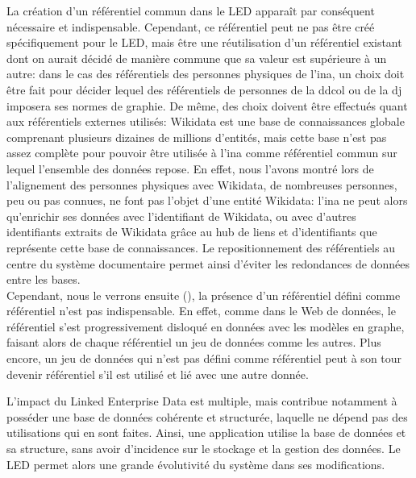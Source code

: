 La création d'un référentiel commun dans le LED apparaît par conséquent nécessaire et indispensable. Cependant, ce référentiel peut ne pas être créé spécifiquement pour le LED, mais être une réutilisation d'un référentiel existant dont on aurait décidé de manière commune que sa valeur est supérieure à un autre: dans le cas des référentiels des personnes physiques de l'\ac{ina}, un choix doit être fait pour décider lequel des référentiels de personnes de la \ac{ddcol} ou de la \ac{dj} imposera ses normes de graphie. De même, des choix doivent être effectués quant aux référentiels externes utilisés: Wikidata est une base de connaissances globale comprenant plusieurs dizaines de millions d'entités, mais cette base n'est pas assez complète pour pouvoir être utilisée à l'\ac{ina} comme référentiel commun sur lequel l'ensemble des données repose. En effet, nous l'avons montré lors de l'alignement des personnes physiques avec Wikidata, de nombreuses personnes, peu ou pas connues, ne font pas l'objet d'une entité Wikidata: l'\ac{ina} ne peut alors qu'enrichir ses données avec l'identifiant de Wikidata, ou avec d'autres identifiants extraits de Wikidata grâce au hub de liens et d'identifiants que représente cette base de connaissances. Le repositionnement des référentiels au centre du système documentaire permet ainsi d'éviter les redondances de données entre les bases.\\

Cependant, nous le verrons ensuite (), la présence d'un référentiel défini comme référentiel n'est pas indispensable. En effet, comme dans le Web de données, le référentiel s'est progressivement disloqué en données avec les modèles en graphe, faisant alors de chaque référentiel un jeu de données comme les autres. Plus encore, un jeu de données qui n'est pas défini comme référentiel peut à son tour devenir référentiel s'il est utilisé et lié avec une autre donnée.

\bigskip
\bigskip

L'impact du Linked Enterprise Data est multiple, mais contribue notamment à posséder une base de données cohérente et structurée, laquelle ne dépend pas des utilisations qui en sont faites. Ainsi, une application utilise la base de données et sa structure, sans avoir d'incidence sur le stockage et la gestion des données. Le LED permet alors une grande évolutivité du système dans ses modifications.
